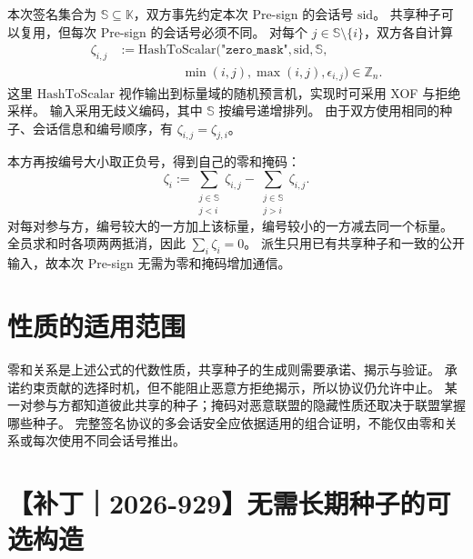 本次签名集合为 $\mathbb{S}\subseteq\mathbb{K}$，双方事先约定本次 Pre-sign 的会话号 $\mathrm{sid}$。
共享种子可以复用，但每次 Pre-sign 的会话号必须不同。
对每个 $j\in\mathbb{S}\setminus\{i\}$，双方各自计算
\begin{equation}
  \label{eq:misc-rerand:zeta-ij}\tag{zeta-ij}
  \begin{aligned}
    \zeta_{i,j}&:=\mathrm{HashToScalar}\bigl(
      \texttt{"zero\_mask"},\mathrm{sid},\mathbb{S}, \\
      &\hspace{5em}\min(i,j),\max(i,j),\epsilon_{i,j}\bigr)\in\mathbb{Z}_n.
  \end{aligned}
\end{equation}
这里 $\mathrm{HashToScalar}$ 视作输出到标量域的随机预言机，实现时可采用 XOF 与拒绝采样。
输入采用无歧义编码，其中 $\mathbb{S}$ 按编号递增排列。
由于双方使用相同的种子、会话信息和编号顺序，有 $\zeta_{i,j}=\zeta_{j,i}$。

本方再按编号大小取正负号，得到自己的零和掩码：
\begin{equation}
  \label{eq:misc-rerand:zeta}\tag{zeta}
  \zeta_i:=\sum_{\substack{j\in\mathbb{S}\\j<i}}\zeta_{i,j}
  -\sum_{\substack{j\in\mathbb{S}\\j>i}}\zeta_{i,j}.
\end{equation}
对每对参与方，编号较大的一方加上该标量，编号较小的一方减去同一个标量。
全员求和时各项两两抵消，因此 $\sum_i\zeta_i=0$。
派生只用已有共享种子和一致的公开输入，故本次 Pre-sign 无需为零和掩码增加通信。

\section{性质的适用范围}

零和关系是上述公式的代数性质，共享种子的生成则需要承诺、揭示与验证。
承诺约束贡献的选择时机，但不能阻止恶意方拒绝揭示，所以协议仍允许中止。
某一对参与方都知道彼此共享的种子；掩码对恶意联盟的隐藏性质还取决于联盟掌握哪些种子。
完整签名协议的多会话安全应依据适用的组合证明，不能仅由零和关系或每次使用不同会话号推出。

\section{【补丁｜2026-929】无需长期种子的可选构造}
\label{sec:rerand:relaxed-zero}

